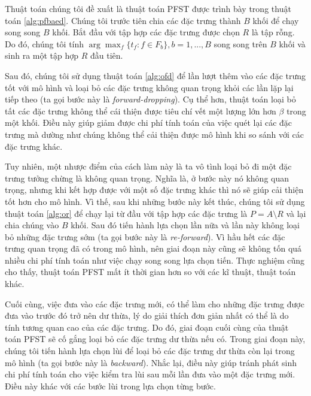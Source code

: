 
Thuật toán chúng tôi đề xuất là thuật toán PFST được trình bày trong thuật toán \ref{alg:pfbaed}. Chúng tôi trước tiên chia các đặc trưng thành $B$ khối để chạy song song $B$ khối. Bắt đầu với tập hợp các đặc trưng được chọn $R$ là tập rỗng. Do đó, chúng tôi tính $\arg\max_{f}\{t_f:f\in F_b\}, b = 1,...,B$ song song trên $B$ khối và sinh ra một tập hợp $R$ đầu tiên.

Sau đó, chúng tôi sử dụng thuật toán \ref{alg:ofd} để lần lượt thêm vào các đặc trưng tốt với mô hình và loại bỏ các đặc trưng không quan trọng khỏi các lần lặp lại tiếp theo (ta gọi bước này là \textit{forward-dropping}). Cụ thể hơn, thuật toán loại bỏ tất các đặc trưng không thể cái thiện được tiêu chí vết một lượng lớn hơn $\beta$ trong một khối. Điều này giúp giảm được chi phí tính toán của việc quét lại các đặc trưng mà dường như chúng không thể cải thiện được mô hình khi so sánh với các đặc trưng khác.

Tuy nhiên, một nhược điểm của cách làm này là ta vô tình loại bỏ đi một đặc trưng tưởng chừng là không quan trọng. Nghĩa là, ở bước này nó không quan trọng, nhưng khi kết hợp được với một số đặc trưng khác thì nó sẽ giúp cải thiện tốt hơn cho mô hình. Vì thế, sau khi những bước này kết thúc, chúng tôi sử dụng thuật toán \ref{alg:or} để chạy lại từ đầu với tập hợp các đặc trưng là $P = A\setminus R$ và lại chia chúng vào $B$ khối. Sau đó tiến hành lựa chọn lần nữa và lần này không loại bỏ những đặc trưng sớm (ta gọi bước này là \textit{re-forward}). Vì hầu hết các đặc trưng quan trọng đã có trong mô hình, nên giai đoạn này cũng sẽ không tốn quá nhiều chi phí tính toán như việc chạy song song lựa chọn tiến. Thực nghiệm cũng cho thấy, thuật toán PFST mất ít thời gian hơn so với các kĩ thuật, thuật toán khác.

Cuối cùng, việc đưa vào các đặc trưng mới, có thể làm cho những đặc trưng được đưa vào trước đó trở nên dư thừa, lý do giải thích đơn giản nhất có thể là do tính tương quan cao của các đặc trưng. Do đó, giai đoạn cuối cùng của thuật toán PFST sẽ cố gắng loại bỏ các đặc trưng dư thừa nếu có. Trong giai đoạn này, chúng tôi tiến hành lựa chọn lùi để loại bỏ các đặc trưng dư thừa còn lại trong mô hình (ta gọi bước này là \textit{backward}). Nhắc lại, điều này giúp tránh phát sinh chi phí tính toán cho việc kiểm tra lùi sau mỗi lần đưa vào một đặc trưng mới. Điều này khác với các bước lùi trong lựa chọn từng bước.

